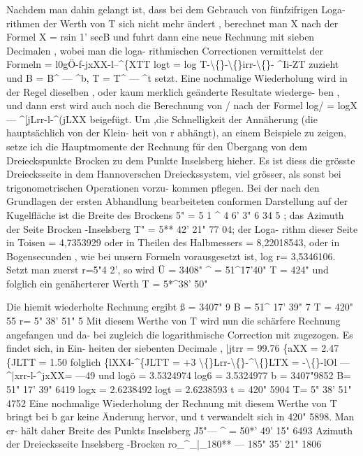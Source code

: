 \documentclass[12pt,a4paper]{article}
\begin{document}
Nachdem  man  dahin  gelangt  ist,  dass  bei  dem  Gebrauch  von  fünfzifrigen  Loga- rithmen der  Werth  von  T  sich  nicht  mehr  ändert ,  berechnet  man  X  nach  der Formel X  =  rsin  1'  secB und  fuhrt  dann  eine  neue  Rechnung  mit  sieben  Decimalen ,  wobei  man  die  loga- rithmischen Correctionen  vermittelst  der  Formeln =  l0gÖ-f-jxXX-l--\^{}\{XTT logt  =  log T-\textbackslash\{\}-\textbackslash\{\}irr-\textbackslash\{\}- \^{}Ii-ZT zuzieht  und  B  =  B\^{}  ---  \^{}b,  T  =  T\^{}  ---  \^{}t  setzt.  Eine  nochmalige  Wiederholung wird  in  der  Regel  dieselben ,  oder  kaum  merklich  geänderte  Resultate  wiederge- ben ,  und  dann  erst  wird  auch  noch  die  Berechnung  von  /  nach  der  Formel log/ =  logX  --- \^{}[jLrr-l-\^{}(jLXX beigefügt.  Um  ,die  Schnelligkeit  der  Annäherung  (die  hauptsächlich  von  der  Klein- heit von  r  abhängt),  an  einem  Beispiele  zu  zeigen,  setze  ich  die  Hauptmomente der  Rechnung  für  den  Übergang  von  dem  Dreieckspunkte  Brocken  zu  dem  Punkte Inselsberg  hieher.  Es  ist  diess  die  grösste  Dreiecksseite  in  dem  Hannoverschen Dreieckssystem,  viel  grösser,  als  sonst  bei  trigonometrischen  Operationen  vorzu- kommen pflegen. Bei  der  nach  den  Grundlagen  der  ersten  Abhandlung  bearbeiteten  conformen Darstellung  auf  der  Kugelfläche  ist  die  Breite  des  Brockens  5"  =  5 1  \^{} 4 6' 3" 6 34 5 ; das  Azimuth  der  Seite  Brocken -Inselsberg  T"  =  5**  42' 21"  77  04;  der  Loga- rithm  dieser  Seite  in  Toisen  =  4,7353929  oder  in  Theilen  des  Halbmessers =  8,22018543,  oder  in  Bogensecunden ,  wie  bei  unsern  Formeln  vorausgesetzt ist,    log  r=  3,5346106.     Setzt  man  zuerst    r=5"4  2',    so  wird Ü  =  3408" \^{}  =  51\^{}17'40" T    =  424" und  folglich  ein  genäherterer  Werth T  =  5*\^{}38' 50"

Die  hiemit  wiederholte  Rechnung  ergibt ß  =  3407"  9 B  =  51\^{}  17'  39"  7 T    =  420"  55 r=  5"  38'  51"  5 Mit  diesem  Werthe  von  T  wird  nun  die  schärfere  Rechnung  angefangen  und  da- bei zugleich  die  logarithmische  Correction  mit  zugezogen.  Es  findet  sich,  in  Ein- heiten der  siebenten  Decimale , |jtrr  =  99.76 \{aXX  =     2.47 \{JLTT    =       1.50 folglich \{lXX4-\^{}\{JLTT  =  +3 \textbackslash\{\}Lrr-\textbackslash\{\}-\^{}\textbackslash\{\}LTX  =  -\textbackslash\{\}-lOl ---  \^{}|xrr-l-\^{}jxXX=  ---49 und logö  =  3.5324974 log6  =  3.5324977 b  =   3407"9852 B=   51"  17'  39"  6419 logx  =  2.6238492 logt   =  2.6238593 t  =  420"  5904 T=   5"  38'  51"  4752 Eine  nochmalige  Wiederholung  der  Rechnung  mit  diesem  Werthe  von  T  bringt bei  b  gar  keine  Änderung  hervor,  und  t  verwandelt  sich  in  420"  5898.  Man  er- hält daher Breite  des  Punkts  Inselsberg J5"--- \^{}  =  50*' 49'  15"  6493 Azimuth  der  Dreiecksseite  Inselsberg -Brocken ro\_\^{}\_|\_180**  ---  185"  35'  21"  1806
\end{document}
